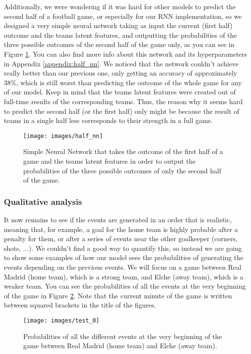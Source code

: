 \documentclass[10pt,conference,onecolumn]{IEEEtran}
\begin{document}
Additionally, we were wondering if it was hard for other models to predict the second half of a football game, or especially for our RNN implementation, so we designed a very simple neural network taking as input the current (first half) outcome and the teams latent features, and outputting the probabilities of the three possible outcomes of the second half of the game only, as you can see in Figure \ref{fig:half_nn}. You can also find more info about this network and its hyperparameters in Appendix \ref{appendix:half_nn}. We noticed that the network couldn't achieve really better than our previous one, only getting an accuracy of approximately 38\%, which is still worst than predicting the outcome of the whole game for any of our model. Keep in mind that the teams latent features were created out of full-time results of the corresponding teams. Thus, the reason why it seems hard to predict the second half (or the first half) only might be because the result of teams in a single half less corresponds to their strength in a full game.

\begin{figure}[H]
\centering
\texttt{[image: images/half\_nn]}
\caption{Simple Neural Network that takes the outcome of the first half of a game and the teams latent features in order to output the probabilities of the three possible outcomes of only the second half of the game.}
\label{fig:half_nn}
\end{figure}

\subsubsection{Qualitative analysis} \label{ssec:qualitative}
It now remains to see if the events are generated in an order that is realistic, meaning that, for example, a goal for the home team is highly probable after a penalty for them, or after a series of events near the other goalkeeper (corners, shots, ...). We couldn't find a good way to quantify this, so instead we are going to show some examples of how our model sees the probabilities of generating the events depending on the previous events. We will focus on a game between Real Madrid (home team), which is a strong team, and Elche (away team), which is a weaker team. You can see the probabilities of all the events at the very beginning of the game in Figure \ref{fig:test_0}. Note that the current minute of the game is written between squared brackets in the title of the figures.

\begin{figure}[H]
\centering
\texttt{[image: images/test\_0]}
\caption{Probabilities of all the different events at the very beginning of the game between Real Madrid (home team) and Elche (away team).}
\label{fig:test_0}
\end{figure}
\end{document}
